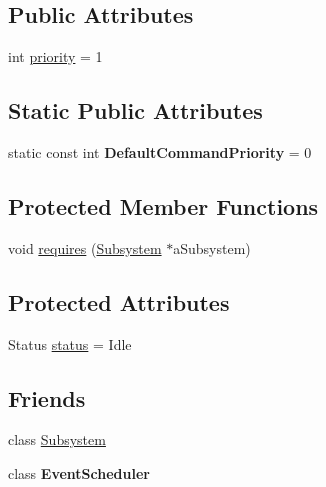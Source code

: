 \subsection*{Public Attributes}
\begin{DoxyCompactItemize}
\item 
int \mbox{\hyperlink{classlib_iterative_robot_1_1_command_af2fd312376da33f5eba582db90389511}{priority}} = 1
\end{DoxyCompactItemize}
\subsection*{Static Public Attributes}
\begin{DoxyCompactItemize}
\item 
\mbox{\label{classlib_iterative_robot_1_1_command_a37cc89119a9f76d0dda57ea21c877c7c}} 
static const int {\bfseries Default\+Command\+Priority} = 0
\end{DoxyCompactItemize}
\subsection*{Protected Member Functions}
\begin{DoxyCompactItemize}
\item 
void \mbox{\hyperlink{classlib_iterative_robot_1_1_command_ad7b7f328974f5f17a2a4b1593b6c9eb5}{requires}} (\mbox{\hyperlink{classlib_iterative_robot_1_1_subsystem}{Subsystem}} $\ast$a\+Subsystem)
\end{DoxyCompactItemize}
\subsection*{Protected Attributes}
\begin{DoxyCompactItemize}
\item 
Status \mbox{\hyperlink{classlib_iterative_robot_1_1_command_a54548a957a6b4097837c41fcc660467e}{status}} = Idle
\end{DoxyCompactItemize}
\subsection*{Friends}
\begin{DoxyCompactItemize}
\item 
class \mbox{\hyperlink{classlib_iterative_robot_1_1_command_a9b67dc4c93b18626e753aa0938abbf7d}{Subsystem}}
\item 
\mbox{\label{classlib_iterative_robot_1_1_command_a2a47195be57876de9e0c9e18467a34a3}} 
class {\bfseries Event\+Scheduler}
\end{DoxyCompactItemize}


